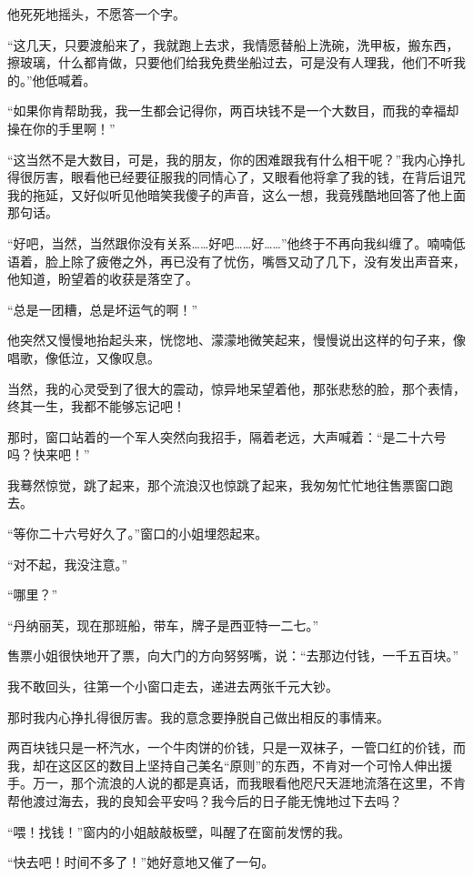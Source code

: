 \par 他死死地摇头，不愿答一个字。
\par “这几天，只要渡船来了，我就跑上去求，我情愿替船上洗碗，洗甲板，搬东西，擦玻璃，什么都肯做，只要他们给我免费坐船过去，可是没有人理我，他们不听我的。”他低喊着。
\par “如果你肯帮助我，我一生都会记得你，两百块钱不是一个大数目，而我的幸福却操在你的手里啊！”
\par “这当然不是大数目，可是，我的朋友，你的困难跟我有什么相干呢？”我内心挣扎得很厉害，眼看他已经要征服我的同情心了，又眼看他将拿了我的钱，在背后诅咒我的拖延，又好似听见他暗笑我傻子的声音，这么一想，我竟残酷地回答了他上面那句话。
\par “好吧，当然，当然跟你没有关系……好吧……好……”他终于不再向我纠缠了。喃喃低语着，脸上除了疲倦之外，再已没有了忧伤，嘴唇又动了几下，没有发出声音来，他知道，盼望着的收获是落空了。
\par “总是一团糟，总是坏运气的啊！”
\par 他突然又慢慢地抬起头来，恍惚地、濛濛地微笑起来，慢慢说出这样的句子来，像唱歌，像低泣，又像叹息。
\par 当然，我的心灵受到了很大的震动，惊异地呆望着他，那张悲愁的脸，那个表情，终其一生，我都不能够忘记吧！
\par 那时，窗口站着的一个军人突然向我招手，隔着老远，大声喊着：“是二十六号吗？快来吧！”
\par 我蓦然惊觉，跳了起来，那个流浪汉也惊跳了起来，我匆匆忙忙地往售票窗口跑去。
\par “等你二十六号好久了。”窗口的小姐埋怨起来。
\par “对不起，我没注意。”
\par “哪里？”
\par “丹纳丽芙，现在那班船，带车，牌子是西亚特一二七。”
\par 售票小姐很快地开了票，向大门的方向努努嘴，说：“去那边付钱，一千五百块。”
\par 我不敢回头，往第一个小窗口走去，递进去两张千元大钞。
\par 那时我内心挣扎得很厉害。我的意念要挣脱自己做出相反的事情来。
\par 两百块钱只是一杯汽水，一个牛肉饼的价钱，只是一双袜子，一管口红的价钱，而我，却在这区区的数目上坚持自己美名“原则”的东西，不肯对一个可怜人伸出援手。万一，那个流浪的人说的都是真话，而我眼看他咫尺天涯地流落在这里，不肯帮他渡过海去，我的良知会平安吗？我今后的日子能无愧地过下去吗？
\par “喂！找钱！”窗内的小姐敲敲板壁，叫醒了在窗前发愣的我。
\par “快去吧！时间不多了！”她好意地又催了一句。
